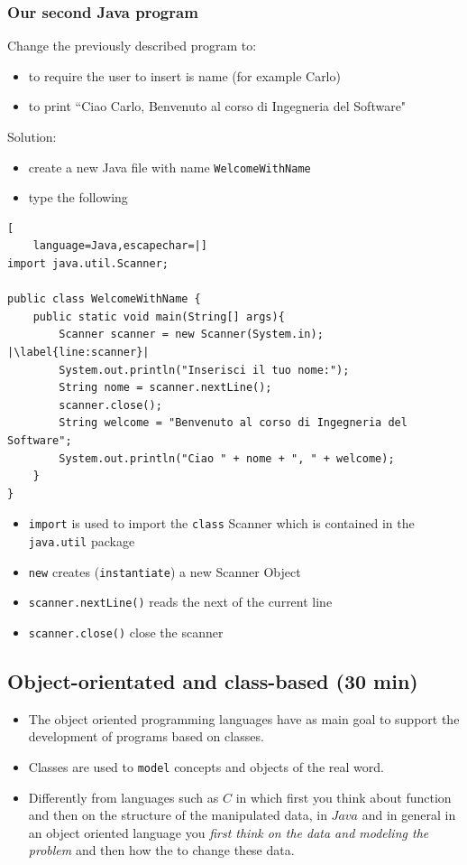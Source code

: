 \documentclass{article}
\theoremstyle{definition}
\begin{document}
\subsubsection{Our second Java program}
Change the previously described program to:
\begin{itemize}
\item to require the user to insert is name (for example Carlo)
\item to print ``Ciao Carlo, Benvenuto al corso di Ingegneria del Software" 
\end{itemize}
Solution:
\begin{itemize}
\item create a new Java file with name \texttt{WelcomeWithName}
\item type the following
\end{itemize}
\begin{lstlisting}[
    language=Java,escapechar=|]
import java.util.Scanner;

public class WelcomeWithName {
	public static void main(String[] args){
		Scanner scanner = new Scanner(System.in); |\label{line:scanner}|
		System.out.println("Inserisci il tuo nome:");
		String nome = scanner.nextLine();
		scanner.close();
		String welcome = "Benvenuto al corso di Ingegneria del Software";
		System.out.println("Ciao " + nome + ", " + welcome);
	}
}
\end{lstlisting}
\begin{itemize}
\item \texttt{import} is used to import the \texttt{class} Scanner which is contained in the \texttt{java.util} package
\item \texttt{new} creates (\texttt{instantiate}) a new Scanner Object
\item \texttt{scanner.nextLine()} reads the next of the current line
\item \texttt{scanner.close()} close the scanner
\end{itemize}


\subsection{Object-orientated and class-based (30 min)}
\begin{itemize}
\item The object oriented programming languages have as main goal to support the development of programs based on classes.
\item  Classes are used to \texttt{model} concepts and objects of the real word.
\item Differently from languages such as $C$ in which first you think about function and then on the structure of the manipulated data, in $Java$ and in general in an object oriented language you \emph{first think on the data and modeling the problem} and then how the to change these data.
\end{itemize}
\end{document}
